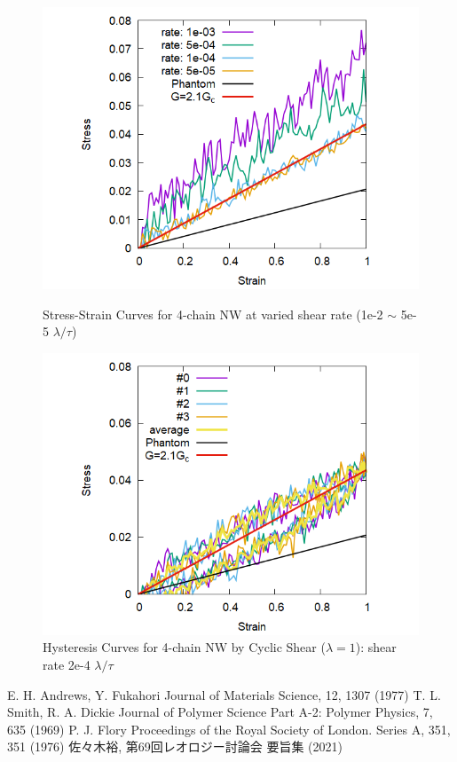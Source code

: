 \documentclass[uplatex,dvipdfmx,a4paper,10pt]{jsarticle}
\begin{document}
\begin{figure}[hb]
    \begin{minipage}{0.5\hsize}
        \begin{center}
        \includegraphics[width=.7\textwidth]{Shear_Random_4chain_N20.png}
        \caption{Stress-Strain Curves for 4-chain NW at varied shear rate (1e-2 $\sim$ 5e-5 $\lambda/\tau$)}
        \label{fig:deform}
        \end{center}
    \end{minipage}
    \begin{minipage}{0.5\hsize}
        \begin{center}
        \includegraphics[width=.7\textwidth]{CyclicDeform_4chain_rate_2e-4.png}
        \caption{Hysteresis Curves for 4-chain NW by Cyclic Shear ($\lambda = 1$): shear rate 2e-4 $\lambda/\tau$}
        \label{fig:hyst}
        \end{center}
    \end{minipage}
\end{figure}

\vspace{-7mm}
\begin{thebibliography}{99}
     E. H. Andrews, Y. Fukahori Journal of Materials Science, 12, 1307 (1977)
     T. L. Smith, R. A. Dickie Journal of Polymer Science Part A-2: Polymer Physics, 7, 635 (1969)
     P. J. Flory Proceedings of the Royal Society of London. Series A, 351, 351 (1976)
     佐々木裕, 第69回レオロジー討論会 要旨集 (2021)
\end{thebibliography}
\end{document}
